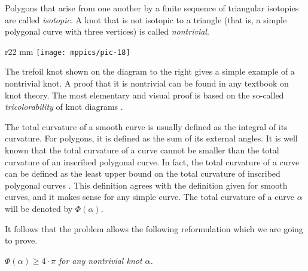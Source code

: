 Polygons that arise from one another by a finite sequence of
triangular isotopies are called \emph{isotopic}.
A knot that is not isotopic to a triangle (that is, a simple polygonal curve with three vertices) is called \emph{nontrivial}.

\begin{wrapfigure}{r}{22 mm}
\vskip-3mm
\centering
\texttt{[image: mppics/pic-18]}
\vskip0mm
\end{wrapfigure}

The trefoil knot shown on the diagram to the right gives a simple example of a nontrivial knot.
A proof that it is nontrivial can be found in any textbook on knot theory.
The most elementary and visual proof is based on the so-called \emph{tricolorability} of knot diagrams \cite[Section 1.5]{adams}.

The total curvature of a smooth curve is usually defined as the integral of its curvature.
For polygons, it is defined as the sum of its external angles.
It is well known that the total curvature of a curve cannot be smaller than the total curvature of an inscribed polygonal curve.
In fact, the total curvature of a curve can be defined as the least upper bound on the total curvature of inscribed polygonal curves \cite{aleksandrov-reshetnyak, sullivan-curves}.
This definition agrees with the definition given for smooth curves, and it makes sense for any simple curve.
The total curvature of a curve $\alpha$ will be denoted by $\Phi(\alpha)$.

It follows that the problem allows the following reformulation which we are going to prove.

\textit{$\Phi(\alpha)\ge 4\cdot\pi$ for any nontrivial knot $\alpha$.}


